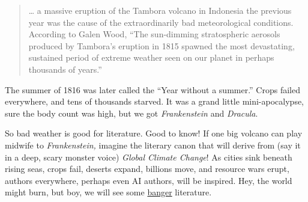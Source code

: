 \begin{quote}
\ldots{} a massive eruption of the Tambora volcano in Indonesia the
previous year was the cause of the extraordinarily bad meteorological
conditions. According to Galen Wood, ``The sun-dimming stratospheric
aerosols produced by Tambora's eruption in 1815 spawned the most
devastating, sustained period of extreme weather seen on our planet in
perhaps thousands of years.''
\end{quote}

The summer of 1816 was later called the ``Year without a summer.'' Crops
failed everywhere, and tens of thousands starved. It was a grand little
mini-apocalypse, sure the body count was high, but we got
\emph{Frankenstein} and \emph{Dracula}.

So bad weather is good for literature. Good to know! If one big volcano
can play midwife to \emph{Frankenstein,} imagine the literary canon that
will derive from (say it in a deep, scary monster voice) \emph{Global
Climate Change}! As cities sink beneath rising seas, crops fail, deserts
expand, billions move, and resource wars erupt, authors everywhere,
perhaps even AI authors, will be inspired. Hey, the world might burn,
but boy, we will see some
\href{https://www.urbandictionary.com/define.php?term=Banger}{banger}
literature.

%

